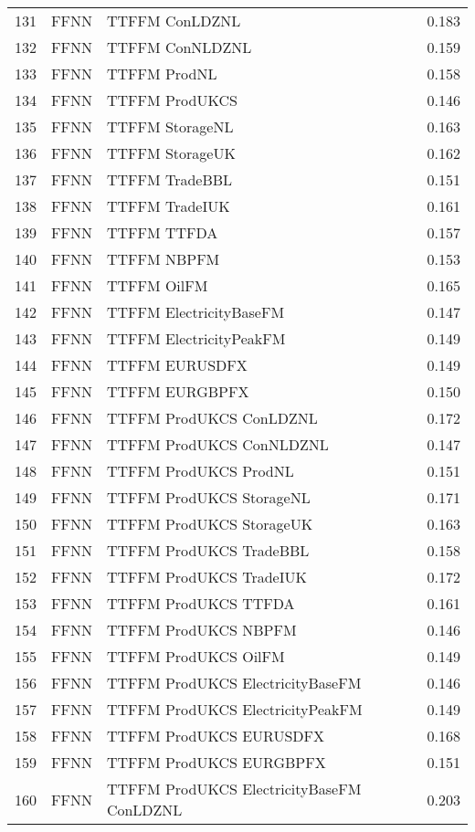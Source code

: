 \begin{table}[ht]
\begin{tabular}{rllr}
  131 & FFNN & TTFFM ConLDZNL & 0.183 \\ 
  132 & FFNN & TTFFM ConNLDZNL & 0.159 \\ 
  133 & FFNN & TTFFM ProdNL & 0.158 \\ 
  134 & FFNN & TTFFM ProdUKCS & 0.146 \\ 
  135 & FFNN & TTFFM StorageNL & 0.163 \\ 
  136 & FFNN & TTFFM StorageUK & 0.162 \\ 
  137 & FFNN & TTFFM TradeBBL & 0.151 \\ 
  138 & FFNN & TTFFM TradeIUK & 0.161 \\ 
  139 & FFNN & TTFFM TTFDA & 0.157 \\ 
  140 & FFNN & TTFFM NBPFM & 0.153 \\ 
  141 & FFNN & TTFFM OilFM & 0.165 \\ 
  142 & FFNN & TTFFM ElectricityBaseFM & 0.147 \\ 
  143 & FFNN & TTFFM ElectricityPeakFM & 0.149 \\ 
  144 & FFNN & TTFFM EURUSDFX & 0.149 \\ 
  145 & FFNN & TTFFM EURGBPFX & 0.150 \\ 
  146 & FFNN & TTFFM ProdUKCS ConLDZNL & 0.172 \\ 
  147 & FFNN & TTFFM ProdUKCS ConNLDZNL & 0.147 \\ 
  148 & FFNN & TTFFM ProdUKCS ProdNL & 0.151 \\ 
  149 & FFNN & TTFFM ProdUKCS StorageNL & 0.171 \\ 
  150 & FFNN & TTFFM ProdUKCS StorageUK & 0.163 \\ 
  151 & FFNN & TTFFM ProdUKCS TradeBBL & 0.158 \\ 
  152 & FFNN & TTFFM ProdUKCS TradeIUK & 0.172 \\ 
  153 & FFNN & TTFFM ProdUKCS TTFDA & 0.161 \\ 
  154 & FFNN & TTFFM ProdUKCS NBPFM & 0.146 \\ 
  155 & FFNN & TTFFM ProdUKCS OilFM & 0.149 \\ 
  156 & FFNN & TTFFM ProdUKCS ElectricityBaseFM & 0.146 \\ 
  157 & FFNN & TTFFM ProdUKCS ElectricityPeakFM & 0.149 \\ 
  158 & FFNN & TTFFM ProdUKCS EURUSDFX & 0.168 \\ 
  159 & FFNN & TTFFM ProdUKCS EURGBPFX & 0.151 \\ 
  160 & FFNN & TTFFM ProdUKCS ElectricityBaseFM ConLDZNL & 0.203 \\ 

\end{tabular}
\end{table}
